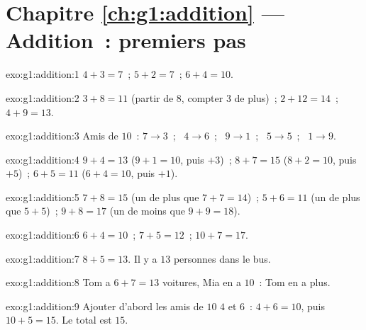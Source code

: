 \section*{Chapitre \ref{ch:g1:addition} --- Addition~: premiers pas}

\begin{solution}{exo:g1:addition:1}
$4 + 3 = 7$~; \quad $5 + 2 = 7$~; \quad $6 + 4 = 10$.
\end{solution}

\begin{solution}{exo:g1:addition:2}
$3 + 8 = 11$ (partir de $8$, compter $3$ de plus)~; \quad
$2 + 12 = 14$~; \quad $4 + 9 = 13$.
\end{solution}

\begin{solution}{exo:g1:addition:3}
Amis de $10$~: $7 \to 3$~; \ $4 \to 6$~; \ $9 \to 1$~; \ $5 \to 5$~;
\ $1 \to 9$.
\end{solution}

\begin{solution}{exo:g1:addition:4}
$9 + 4 = 13$ ($9 + 1 = 10$, puis $+3$)~; \quad
$8 + 7 = 15$ ($8 + 2 = 10$, puis $+5$)~; \quad
$6 + 5 = 11$ ($6 + 4 = 10$, puis $+1$).
\end{solution}

\begin{solution}{exo:g1:addition:5}
$7 + 8 = 15$ (un de plus que $7 + 7 = 14$)~; \quad
$5 + 6 = 11$ (un de plus que $5 + 5$)~; \quad
$9 + 8 = 17$ (un de moins que $9 + 9 = 18$).
\end{solution}

\begin{solution}{exo:g1:addition:6}
$6 + 4 = 10$~; \quad $7 + 5 = 12$~; \quad $10 + 7 = 17$.
\end{solution}

\begin{solution}{exo:g1:addition:7}
$8 + 5 = 13$. Il y a $13$ personnes dans le bus.
\end{solution}

\begin{solution}{exo:g1:addition:8}
Tom a $6 + 7 = 13$ voitures, Mia en a $10$~: Tom en a plus.
\end{solution}

\begin{solution}{exo:g1:addition:9}
Ajouter d'abord les amis de $10$ $4$ et $6$~: $4 + 6 = 10$, puis
$10 + 5 = 15$. Le total est $15$.
\end{solution}
